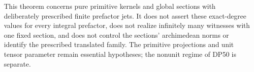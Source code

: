 This theorem concerns pure primitive kernels and global sections with deliberately prescribed finite prefactor jets. It does not assert these exact-degree values for every integral prefactor, does not realize infinitely many witnesses with one fixed section, and does not control the sections' archimedean norms or identify the prescribed translated family. The primitive projections and unit tensor parameter remain essential hypotheses; the nonunit regime of DP50 is separate.
